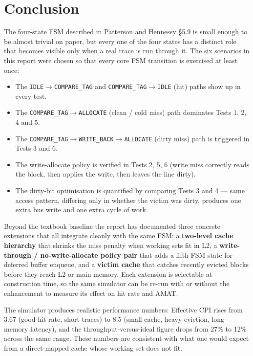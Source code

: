 \documentclass[11pt,a4paper]{article}
\begin{document}
\section{Conclusion}\label{sec:conc}

The four-state FSM described in Patterson and Hennessy \S5.9 is small enough
to be almost trivial on paper, but every one of the four states has a
distinct role that becomes visible only when a real trace is run through it.
The six scenarios in this report were chosen so that every core FSM
transition is exercised at least once:

\begin{itemize}[leftmargin=1.4em,itemsep=0.1em]
    \item The \texttt{IDLE}$\to$\texttt{COMPARE\_TAG} and
    \texttt{COMPARE\_TAG}$\to$\texttt{IDLE} (hit) paths show up in every test.
    \item The \texttt{COMPARE\_TAG}$\to$\texttt{ALLOCATE} (clean / cold miss)
    path dominates Tests 1, 2, 4 and 5.
    \item The
    \texttt{COMPARE\_TAG}$\to$\texttt{WRITE\_BACK}$\to$\texttt{ALLOCATE}
    (dirty miss) path is triggered in Tests 3 and 6.
    \item The write-allocate policy is verified in Tests 2, 5, 6 (write miss
    correctly reads the block, then applies the write, then leaves the line
    dirty).
    \item The dirty-bit optimisation is quantified by comparing Tests 3 and
    4 — same access pattern, differing only in whether the victim was dirty,
    produces one extra bus write and one extra cycle of work.
\end{itemize}

Beyond the textbook baseline the report has documented three concrete
extensions that all integrate cleanly with the same FSM: a \textbf{two-level
cache hierarchy} that shrinks the miss penalty when working sets fit in L2,
a \textbf{write-through / no-write-allocate policy pair} that adds a fifth
FSM state for deferred buffer enqueue, and a \textbf{victim cache} that
catches recently evicted blocks before they reach L2 or main memory. Each
extension is selectable at construction time, so the same simulator can be
re-run with or without the enhancement to measure its effect on hit rate and
AMAT.

The simulator produces realistic performance numbers: Effective CPI rises
from 3.67 (good hit rate, short traces) to 8.5 (small cache, heavy eviction,
long memory latency), and the throughput-versus-ideal figure drops from 27\%
to 12\% across the same range. These numbers are consistent with what one
would expect from a direct-mapped cache whose working set does not fit.
\end{document}
